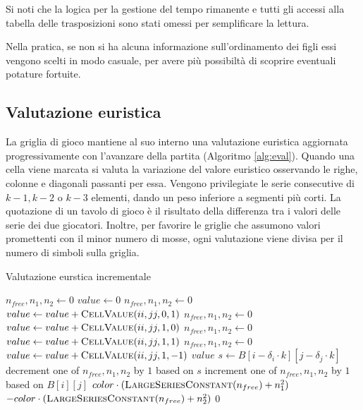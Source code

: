 \documentclass{article}
\begin{document}
Si noti che la logica per la gestione del tempo rimanente e tutti gli accessi
alla tabella delle trasposizioni sono stati omessi per semplificare la lettura.

Nella pratica, se non si ha alcuna informazione sull'ordinamento dei figli
essi vengono scelti in modo casuale, per avere pi\`u possibilt\`a di scoprire
eventuali potature fortuite.

\subsection{Valutazione euristica}

La griglia di gioco mantiene al suo interno una valutazione euristica 
aggiornata progressivamente con l'avanzare della partita (Algoritmo \vref{alg:eval}).
Quando una cella viene marcata si valuta la variazione del valore euristico osservando
le righe, colonne e diagonali passanti per essa. Vengono privilegiate le serie consecutive 
di $k-1, k-2$ o $k-3$ elementi, dando un peso inferiore a segmenti pi\`u corti.
La quotazione di un tavolo di gioco \`e il risultato della differenza tra i
valori delle serie dei due giocatori. Inoltre, per favorire le griglie che
assumono valori promettenti con il minor numero di mosse, ogni
valutazione viene divisa per il numero di simboli sulla griglia.

\begin{algorithm}[H]
  \caption{Valutazione eurstica incrementale}
  \label{alg:eval}
  \begin{algorithmic}[0]
    \State $n_{free}, n_1, n_2 \gets 0$
      \State $value \gets 0$
      \State $n_{free}, n_1, n_2 \gets 0$
        \State $value \gets value + \Call{CellValue}{ii, jj, 0, 1}$
      \EndFor
      \State $n_{free}, n_1, n_2 \gets 0$
        \State $value \gets value + \Call{CellValue}{ii, jj, 1, 0}$
      \EndFor
      \State $n_{free}, n_1, n_2 \gets 0$
        \State $value \gets value + \Call{CellValue}{ii, jj, 1, 1}$
      \EndFor
      \State $n_{free}, n_1, n_2 \gets 0$
        \State $value \gets value + \Call{CellValue}{ii, jj, 1, -1}$
      \EndFor
      \State \Return $value$
    \EndProcedure
       
        \State $s \gets B[i - \delta_i \cdot k][j - \delta_j \cdot k]$ 
        \State decrement one of $n_{free}, n_1, n_2$ by $1$ based on $s$
      \EndIf
      \State increment one of $n_{free}, n_1, n_2$ by $1$ based on $B[i][j]$
      \Statex
        \State \Return $color \cdot (\Call{LargeSeriesConstant}{n_{free}} + n_1^2)$
        \State \Return $-color \cdot (\Call{LargeSeriesConstant}{n_{free}} + n_2^2)$
      \Else
        \State \Return $0$
      \EndIf
    \EndProcedure
  \end{algorithmic}
\end{algorithm}
\end{document}
